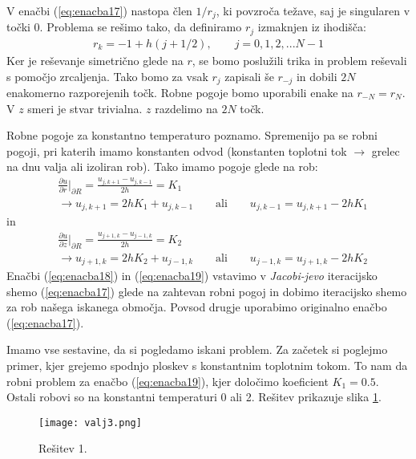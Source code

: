 \documentclass[12pt,a4paper]{article}
\begin{document}
V enačbi (\ref{eq:enacba17}) nastopa člen $1/r_j$, ki povzroča težave, saj je singularen v točki 0. Problema se rešimo tako, da definiramo $r_j$ izmaknjen iz ihodišča:
\begin{align*}
r_k= -1+ h\left( j + 1/2 \right), \qquad j=0,1,2, ...   N-1
\end{align*}
Ker je reševanje simetrično glede na $r$, se bomo poslužili trika in problem reševali s pomočjo zrcaljenja. Tako bomo za vsak $r_j$ zapisali še $r_{-j}$ in dobili $2N$ enakomerno razporejenih točk. Robne pogoje bomo uporabili enake na $r_{-N}=r_{N}$.  V $z$ smeri je stvar trivialna. $z$ razdelimo na $2N$ točk.

Robne pogoje za konstantno temperaturo poznamo. Spremenijo pa se robni pogoji, pri katerih imamo konstanten odvod (konstanten toplotni tok $\rightarrow$ grelec na dnu valja ali izoliran rob).
Tako imamo pogoje glede na rob:
\begin{align} \label{eq:enacba18}
& \frac{\partial u}{\partial r}\biggr|_{\partial R} = \frac{u_{j,k+1} - u_{j,k-1}}{2h} = K_1 \nonumber \\
& \rightarrow u_{j,k+1}= 2hK_1 + u_{j,k-1} \qquad \textrm{ali} \qquad u_{j,k-1}= u_{j,k+1} -2hK_1
\end{align}
in
\begin{align} \label{eq:enacba19}
& \frac{\partial u}{\partial z}\biggr|_{\partial R} = \frac{u_{j+1,k} - u_{j-1,k}}{2h} = K_2 \nonumber \\
& \rightarrow u_{j+1,k}= 2hK_2 + u_{j-1,k} \qquad \textrm{ali} \qquad u_{j-1,k}= u_{j+1,k} -2hK_2
\end{align}
Enačbi (\ref{eq:enacba18}) in (\ref{eq:enacba19}) vstavimo v \textit{Jacobi-jevo} iteracijsko shemo (\ref{eq:enacba17}) glede na zahtevan robni pogoj in dobimo iteracijsko shemo za rob našega iskanega območja. Povsod drugje uporabimo originalno enačbo (\ref{eq:enacba17}).

Imamo vse sestavine, da si pogledamo iskani problem. Za začetek si poglejmo primer, kjer grejemo spodnjo ploskev s konstantnim toplotnim tokom. To nam da robni problem za enačbo (\ref{eq:enacba19}), kjer določimo koeficient $K_1=0.5$. Ostali robovi so na konstantni temperaturi 0 ali 2. Rešitev prikazuje slika \ref{fig:slika12}.

\begin{figure}[H]
\begin{center}
\texttt{[image: valj3.png]}
\caption{Rešitev 1.} \label{fig:slika12}
\end{center}
\end{figure}
\end{document}
